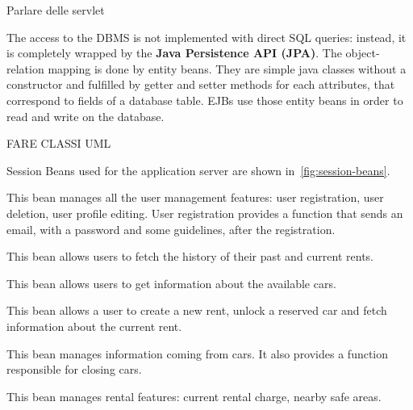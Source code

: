 Parlare delle servlet

The access to the DBMS is not implemented with direct SQL queries: instead, it is completely wrapped by the \textbf{Java Persistence API (JPA)}. The object-relation mapping is done by entity beans. They are simple java classes without a constructor and fulfilled by getter and setter methods for each attributes, that correspond to fields of a database table. EJBs use those entity beans in order to read and write on the database.

FARE CLASSI UML

Session Beans used for the application server are shown in~\autoref{fig:session-beans}.

This bean manages all the user management features: user registration, user deletion, user profile editing.
User registration provides a function that sends an email, with a password and some guidelines, after the registration.

This bean allows users to fetch the history of their past and current rents.

This bean allows users to get information about the available cars.

This bean allows a user to create a new rent, unlock a reserved car and fetch information about the current rent.

This bean manages information coming from cars. It also provides a function responsible for closing cars.

This bean manages rental features: current rental charge, nearby safe areas.

